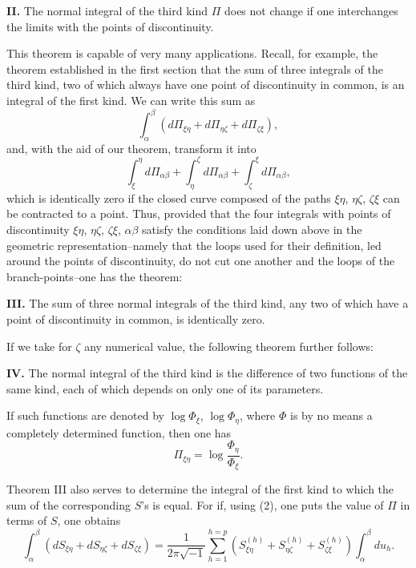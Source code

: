\documentclass[10pt]{article}
\begin{document}
\noindent\textbf{II.} The normal integral of the third kind \(\Pi\) does not change if one interchanges the limits with the points of discontinuity.

This theorem is capable of very many applications. Recall, for example, the theorem established in the first section that the sum of three integrals of the third kind, two of which always have one point of discontinuity in common, is an integral of the first kind. We can write this sum as
\[
\int_{\alpha}^{\beta}\left(d\Pi_{\xi\eta}+d\Pi_{\eta\zeta}+d\Pi_{\zeta\xi}\right),
\]
and, with the aid of our theorem, transform it into
\[
\int_{\xi}^{\eta}d\Pi_{\alpha\beta}+\int_{\eta}^{\zeta}d\Pi_{\alpha\beta}+\int_{\zeta}^{\xi}d\Pi_{\alpha\beta},
\]
which is identically zero if the closed curve composed of the paths \(\xi\eta\), \(\eta\zeta\), \(\zeta\xi\) can be contracted to a point. Thus, provided that the four integrals with points of discontinuity \(\xi\eta\), \(\eta\zeta\), \(\zeta\xi\), \(\alpha\beta\) satisfy the conditions laid down above in the geometric representation--namely that the loops used for their definition, led around the points of discontinuity, do not cut one another and the loops of the branch-points--one has the theorem:

\noindent\textbf{III.} The sum of three normal integrals of the third kind, any two of which have a point of discontinuity in common, is identically zero.

If we take for \(\zeta\) any numerical value, the following theorem further follows:

\noindent\textbf{IV.} The normal integral of the third kind is the difference of two functions of the same kind, each of which depends on only one of its parameters.

If such functions are denoted by \(\log \Phi_\xi\), \(\log \Phi_\eta\), where \(\Phi\) is by no means a completely determined function, then one has
\[
\tag{4}
\Pi_{\xi\eta}=\log\frac{\Phi_\eta}{\Phi_\xi}.
\]

Theorem III also serves to determine the integral of the first kind to which the sum of the corresponding \(S\)'s is equal. For if, using (2), one puts the value of \(\Pi\) in terms of \(S\), one obtains
\[
\tag{5}
\int_{\alpha}^{\beta}\left(dS_{\xi\eta}+dS_{\eta\zeta}+dS_{\zeta\xi}\right)
=\frac{1}{2\pi\sqrt{-1}}\sum_{h=1}^{h=p}
\left(S_{\xi\eta}^{(h)}+S_{\eta\zeta}^{(h)}+S_{\zeta\xi}^{(h)}\right)
\int_{\alpha}^{\beta}du_h.
\]
\end{document}

